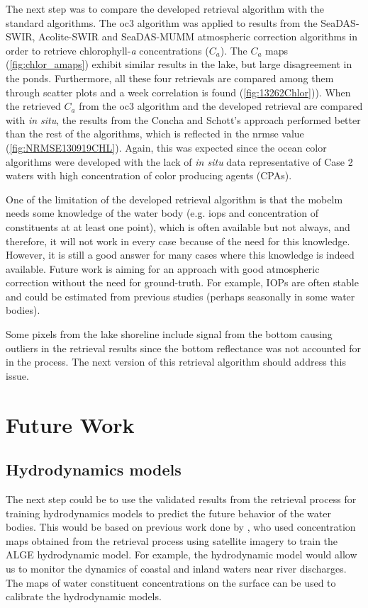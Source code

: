 The next step was to compare the developed retrieval algorithm with the standard algorithms. The \gls{oc3} algorithm was applied to results from the SeaDAS-SWIR, Acolite-SWIR and SeaDAS-MUMM atmospheric correction algorithms in order to retrieve chlorophyll-{\it a} concentrations ($C_a$). The $C_a$ maps (\autoref{fig:chlor_amaps}) exhibit similar results in the lake, but large disagreement in the ponds. Furthermore, all these four retrievals are compared among them through scatter plots and a week correlation is found (\autoref{fig:13262Chlor})). When the retrieved $C_a$ from the \gls{oc3} algorithm and the developed retrieval are compared with {\it in situ}, the results from the Concha and Schott's approach performed better than the rest of the algorithms, which is reflected in the \gls{nrmse} value (\autoref{fig:NRMSE130919CHL}). Again, this was expected since the ocean color algorithms were developed with the lack of {\it in situ} data representative of Case 2 waters with high concentration of color producing agents (CPAs).




One of the limitation of the developed retrieval algorithm is that the \gls{mobelm} needs some knowledge of the water body (e.g. \gls{iops} and concentration of constituents at at least one point), which is often available but not always, and therefore, it will not work in every case because of the need for this knowledge. However, it is still a good answer for many cases where this knowledge is indeed available. Future work is aiming for an approach with good atmospheric correction without the need for ground-truth. For example, IOPs are often stable and could be estimated from previous studies (perhaps seasonally in some water bodies).

Some pixels from the lake shoreline include signal from the bottom causing outliers in the retrieval results since the bottom reflectance was not accounted for in the process. The next version of this retrieval algorithm should address this issue. 

\section{Future Work}
\label{sec:futurework}
\subsection{Hydrodynamics models} 
The next step could be to use the validated results from the retrieval process for training hydrodynamics models to predict the future behavior of the water bodies. This would be based on previous work done by \cite{Pahlevan:2012b}, who used concentration maps obtained from the retrieval process using satellite imagery to train the ALGE hydrodynamic model. For example, the hydrodynamic model would allow us to monitor the dynamics of coastal and inland waters near river discharges. The maps of water constituent concentrations on the surface can be used to calibrate the hydrodynamic models.

